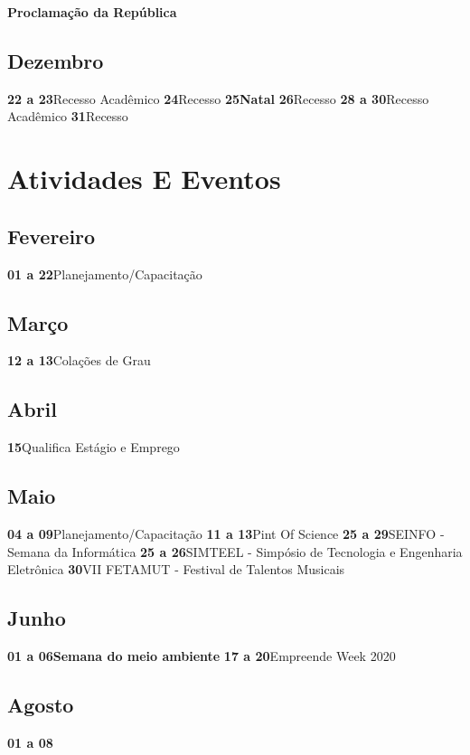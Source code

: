 \documentclass[thesis]{hmcposter}
\begin{document}
\begin{poster}
\textbf{Proclamação da República} \newline\subsection{Dezembro}\textbf{22 a 23}\quad \quad Recesso Acadêmico \newline\textbf{24}\quad \quad \quad \quad Recesso \newline\textbf{25}\quad \quad \quad \quad \textbf{Natal} \newline\textbf{26}\quad \quad \quad \quad Recesso \newline\textbf{28 a 30}\quad \quad Recesso Acadêmico \newline\textbf{31}\quad \quad \quad \quad Recesso \newline\newpage
\normalsize \section{\color{hmcorange}Atividades E Eventos}\subsection{Fevereiro}\textbf{01 a 22}\quad \quad Planejamento/Capacitação \newline\subsection{Março}\textbf{12 a 13}\quad \quad Colações de Grau \newline\subsection{Abril}\textbf{15}\quad \quad \quad \quad Qualifica Estágio e Emprego \newline\subsection{Maio}\textbf{04 a 09}\quad \quad Planejamento/Capacitação \newline\textbf{11 a 13}\quad \quad Pint Of Science \newline\textbf{25 a 29}\quad \quad SEINFO - Semana da Informática \newline\textbf{25 a 26}\quad \quad SIMTEEL - Simpósio de Tecnologia e Engenharia Eletrônica \newline\textbf{30}\quad \quad \quad \quad VII FETAMUT - Festival de Talentos Musicais \newline\subsection{Junho}\textbf{01 a 06}\quad \quad \textbf{Semana do meio ambiente} \newline\textbf{17 a 20}\quad \quad Empreende Week 2020 \newline\subsection{Agosto}\textbf{01 a 08}\quad \quad 
\end{poster}
\end{document}
